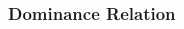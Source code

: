 \documentclass[aspectratio=169]{beamer}
\begin{document}
\begin{frame}
\begin{columns}
\begin{column}{.35\textwidth}
\end{column}
\end{columns}
\end{frame}

\begin{frame}\frametitle{Dominance Relation}
\begin{columns}
\begin{column}{.5\textwidth}
\begin{center}

\vskip -2.3in


\end{center}
\end{column}
\end{columns}
\end{frame}
\end{document}
